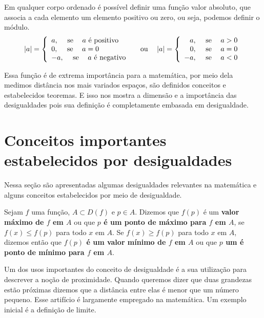 \documentclass[glenn,refnum,codigo]{Estilo}
\begin{document}
Em qualquer corpo ordenado é possível definir uma função valor absoluto, que
associa a cada elemento um
elemento positivo ou zero, ou seja, podemos definir o módulo.
\[
   |a| = \left\{\begin{array}{l}
                   a, \hspace{1.25em}\hbox{se}\hspace{1.25em} a\,\,\hbox{é positivo}\\
                   0, \hspace{1.25em}\hbox{se}\hspace{1.25em} a=0\\
                  -a, \hspace{1.25em}\hbox{se}\hspace{1.25em} a\,\,\hbox{é negativo}
               \end{array}
         \right. \hspace{1.25em}\hbox{ou}\hspace{1.25em}
   |a| = \left\{\begin{array}{r}
                   a, \hspace{1.25em}\hbox{se}\hspace{1.25em} a>0\\
                   0, \hspace{1.25em}\hbox{se}\hspace{1.25em} a=0\\
                  -a, \hspace{1.25em}\hbox{se}\hspace{1.25em} a<0
             \end{array}
         \right.
\]

Essa função é de extrema importância para a matemática, por meio dela medimos
distância nos mais
variados espaços, são definidos conceitos e estabelecidos teoremas. E isso nos
mostra a dimensão e a
importância das desigualdades pois sua definição é completamente embasada em
desigualdade.

\section{Conceitos importantes estabelecidos por desigualdades}

Nessa seção são apresentadas algumas desigualdades relevantes na
matemática e alguns conceitos estabelecidos por meio de desigualdade.


\begin{define}
	Sejam $f$ uma função, $A \subset D(f)$ e $p \in A$. Dizemos que $f(p)$ é um
	\textbf{valor máximo de $f$ em $A$} ou que \textbf{$p$ é um ponto de máximo para
		$f$ em $A$}, se $f(x) \leqslant f(p)$ para todo $x$ em $A$.
	Se $f(x) \geqslant f(p)$ para todo $x$ em $A$, dizemos então que \textbf{$f(p)$
		é um valor mínimo de $f$ em $A$} ou que \textbf{$p$ um é ponto de mínimo para
		$f$ em $A$}.
\end{define}


Um dos usos importantes do conceito de desigualdade é a sua utilização para
descrever a noção de proximidade. Quando queremos dizer que duas grandezas estão
próximas dizemos que a distância entre elas é menor que um número pequeno. Esse
artifício é largamente empregado na matemática. Um exemplo inicial é a definição
de limite.
\end{document}
